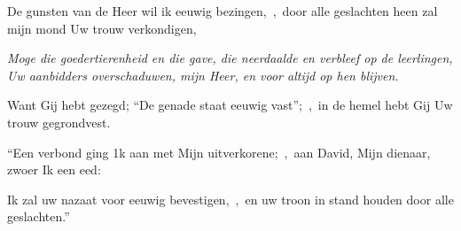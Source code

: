 \documentclass[12pt,twoside,a5paper]{article}
\begin{document}






\begin{halfparskip}
  De gunsten van de Heer wil ik eeuwig bezingen,~\sep\ door alle geslachten heen zal mijn mond Uw trouw verkondigen,


   \emph{Moge die goedertierenheid en die gave, die neerdaalde en verbleef op de leerlingen, Uw aanbidders overschaduwen, mijn Heer, en voor altijd op hen blijven.}

  Want Gij hebt gezegd; ``De genade staat eeuwig vast'';~\sep\ in de hemel hebt Gij Uw trouw gegrondvest.

  ``Een verbond ging 1k aan met Mijn uitverkorene;~\sep\ aan David, Mijn dienaar, zwoer Ik een eed:

  Ik zal uw nazaat voor eeuwig bevestigen,~\sep\ en uw troon in stand houden door alle geslachten.''
\end{halfparskip}

\end{document}
